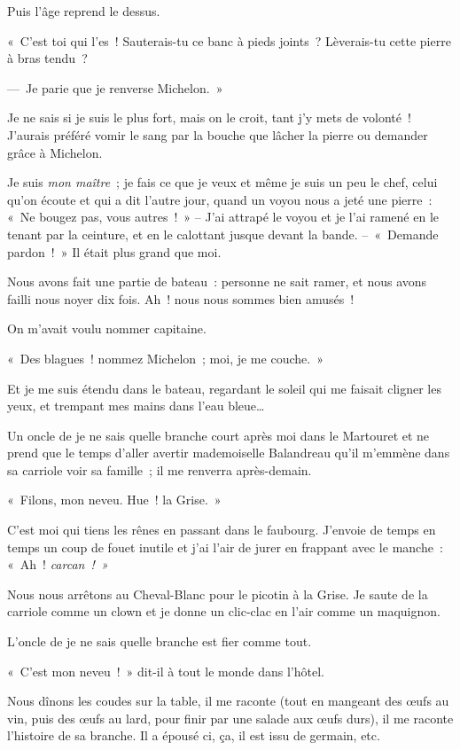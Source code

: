 \documentclass[french,twoside]{book} %
\begin{document}
Puis l’âge reprend le dessus.\par
« C’est toi qui l’es ! Sauterais-tu ce banc à pieds joints ? Lèverais-tu cette pierre à bras tendu ?\par
— Je parie que je renverse Michelon. »\par
Je ne sais si je suis le plus fort, mais on le croit, tant j’y mets de volonté ! J’aurais préféré vomir le sang par la bouche que lâcher la pierre ou demander grâce à Michelon.\par
Je suis \emph{mon maître} ; je fais ce que je veux et même je suis un peu le chef, celui qu’on écoute et qui a dit l’autre jour, quand un voyou nous a jeté une pierre : « Ne bougez pas, vous autres ! » – J’ai attrapé le voyou et je l’ai ramené en le tenant par la ceinture, et en le calottant jusque devant la bande. – « Demande pardon ! » Il était plus grand que moi.\par
\bigbreak
\noindent Nous avons fait une partie de bateau : personne ne sait ramer, et nous avons failli nous noyer dix fois. Ah ! nous nous sommes bien amusés !\par
\bigbreak
\noindent On m’avait voulu nommer capitaine.\par
« Des blagues ! nommez Michelon ; moi, je me couche. »\par
Et je me suis étendu dans le bateau, regardant le soleil qui me faisait cligner les yeux, et trempant mes mains dans l’eau bleue…\par
\bigbreak
\noindent Un oncle de je ne sais quelle branche court après moi dans le Martouret et ne prend que le temps d’aller avertir mademoiselle Balandreau qu’il m’emmène dans sa carriole voir sa famille ; il me renverra après-demain.\par
« Filons, mon neveu. Hue ! la Grise. »\par
C’est moi qui tiens les rênes en passant dans le faubourg. J’envoie de temps en temps un coup de fouet inutile et j’ai l’air de jurer en frappant avec le manche : « Ah ! \emph{carcan ! »}\par
Nous nous arrêtons au Cheval-Blanc pour le picotin à la Grise. Je saute de la carriole comme un clown et je donne un clic-clac en l’air comme un maquignon.\par
L’oncle de je ne sais quelle branche est fier comme tout.\par
« C’est mon neveu ! » dit-il à tout le monde dans l’hôtel.\par
Nous dînons les coudes sur la table, il me raconte (tout en mangeant des œufs au vin, puis des œufs au lard, pour finir par une salade aux œufs durs), il me raconte l’histoire de sa branche. Il a épousé ci, ça, il est issu de germain, etc.\par
\end{document}
